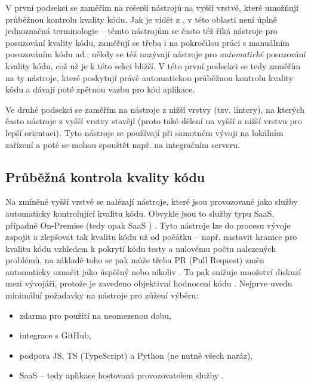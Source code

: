 V první podsekci se zaměřím na rešerši nástrojů na vyšší vrstvě, které umožňují průběžnou kontrolu kvality kódu. Jak je vidět z \cite{guru-codereview, gh-awesomecodereview, medium-devgurus,stackshare-codereview, gh-awesomecodereview2}, v této oblasti není úplně jednoznačná terminologie -- těmto nástrojům se často též říká nástroje pro posuzování kvality kódu, zaměřují se třeba i na pokročilou práci s manuálním posuzováním kódu ad., někdy se též nazývají nástroje pro \textit{automatické} posuzování kvality kódu, což už je k této sekci bližší. V této první podsekci se tedy zaměřím na ty nástroje, které poskytují právě automatickou průběžnou kontrolu kvality kódu a dávají poté zpětnou vazbu pro kód aplikace.

Ve druhé podsekci se zaměřím na nástroje z nižší vrstvy (tzv. lintery), na kterých často nástroje z vyšší vrstvy stavějí (proto také dělení na vyšší a nižší vrstvu pro lepší orientaci). Tyto nástroje se používají při samotném vývoji na lokálním zařízení a poté se mohou spouštět např. na integračním serveru.

\subsection{Průběžná kontrola kvality kódu}

Na zmíněné vyšší vrstvě se nalézají nástroje, které jsou provozované jako služby automaticky kontrolující kvalitu kódu. Obvykle jsou to služby typu SaaS, případně On-Premise (tedy opak SaaS \cite{globema-onpremise}) \cite{codebeat-engines}. Tyto nástroje lze do procesu vývoje zapojit a zlepšovat tak kvalitu kódu už od počátku -- např. nastavit hranice pro kvalitu kódu vzhledem k pokrytí kódu testy a nulovému počtu nalezených problémů, na základě toho se pak může třeba PR (Pull Request) změn automaticky označit jako úspěšný nebo nikoliv \cite{medium-devgurus}. To pak snižuje množství diskuzí mezi vývojáři, protože je zavedeno objektivní hodnocení kódu \cite{medium-devgurus}. Nejprve uvedu minimální požadavky na nástroje pro zúžení výběru:
\begin{itemize}
    \item zdarma pro použití na neomezenou dobu,
    \item integrace s GitHub,
    \item podpora JS, TS (TypeScript) a Python (ne nutně všech naráz),
    \item SaaS -- tedy aplikace hostovaná provozovatelem služby \cite{oracle-saas}.
\end{itemize}

